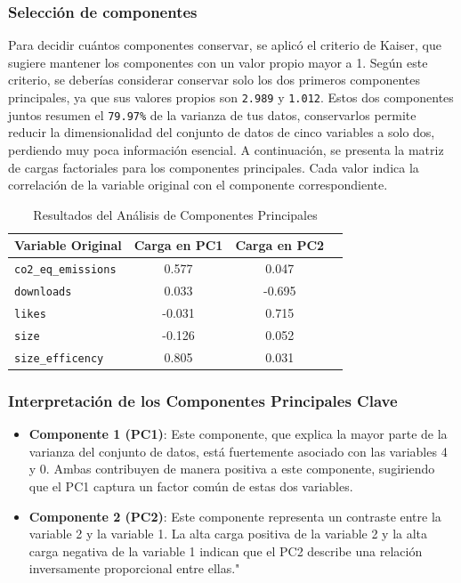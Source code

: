 \documentclass[journal]{IEEEtran}
\begin{document}
	\subsubsection{Selección de componentes}
	Para decidir cuántos componentes conservar, se aplicó el criterio de  Kaiser, que sugiere mantener los componentes con un valor propio mayor a 1.
	Según este criterio, se deberías considerar conservar solo los dos primeros componentes principales, ya que sus valores propios son \texttt{2.989} y \texttt{1.012}.
	Estos dos componentes juntos resumen el \texttt{79.97\%} de la varianza de tus datos, conservarlos permite reducir la dimensionalidad del conjunto de datos de cinco variables a solo dos, perdiendo muy poca información esencial.
	A continuación, se presenta la matriz de cargas factoriales para los componentes principales. Cada valor indica la correlación de la variable original con el componente correspondiente.

	\begin{table}[H]
		\centering
		\caption{Resultados del Análisis de Componentes Principales}
		\begin{tabular}{l c c c}
			\toprule
			Variable Original & Carga en PC1 & Carga en PC2 \\
			\midrule
			\texttt{co2\_eq\_emissions} & 0.577 & 0.047 \\
			\texttt{downloads} & 0.033 & -0.695 \\
			\texttt{likes} & -0.031 & 0.715 \\
			\texttt{size} & -0.126 & 0.052 \\
			\texttt{size\_efficency} & 0.805 & 0.031 \\
			\bottomrule
		\end{tabular}
		\label{tab:pca_results}
	\end{table}


	\subsubsection{Interpretación de los Componentes Principales Clave}
	\begin{itemize}
		\item \textbf{Componente 1 (PC1)}: Este componente, que explica la mayor parte de la varianza del conjunto de datos, está fuertemente asociado con las variables 4 y 0. Ambas contribuyen de manera positiva a este componente, sugiriendo que el PC1 captura un factor común de estas dos variables.
		\item \textbf{Componente 2 (PC2)}: Este componente representa un contraste entre la variable 2 y la variable 1. La alta carga positiva de la variable 2 y la alta carga negativa de la variable 1 indican que el PC2 describe una relación inversamente proporcional entre ellas."
	\end{itemize}
\end{document}
